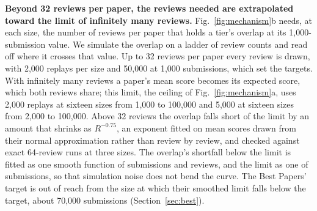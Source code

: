 \documentclass{article}
\begin{document}
\textbf{Beyond 32 reviews per paper, the reviews needed are extrapolated toward the limit of infinitely many reviews.} Fig.~\ref{fig:mechanism}b needs, at each size, the number of reviews per paper that holds a tier's overlap at its 1,000-submission value. We simulate the overlap on a ladder of review counts and read off where it crosses that value. Up to 32 reviews per paper every review is drawn, with 2,000 replays per size and 50,000 at 1,000 submissions, which set the targets. With infinitely many reviews a paper's mean score becomes its expected score, which both reviews share; this limit, the ceiling of Fig.~\ref{fig:mechanism}a, uses 2,000 replays at sixteen sizes from 1,000 to 100,000 and 5,000 at sixteen sizes from 2,000 to 100,000. Above 32 reviews the overlap falls short of the limit by an amount that shrinks as $R^{-0.75}$, an exponent fitted on mean scores drawn from their normal approximation rather than review by review, and checked against exact 64-review runs at three sizes. The overlap's shortfall below the limit is fitted as one smooth function of submissions and reviews, and the limit as one of submissions, so that simulation noise does not bend the curve. The Best Papers' target is out of reach from the size at which their smoothed limit falls below the target, about 70,000 submissions (Section~\ref{sec:best}).
\end{document}
